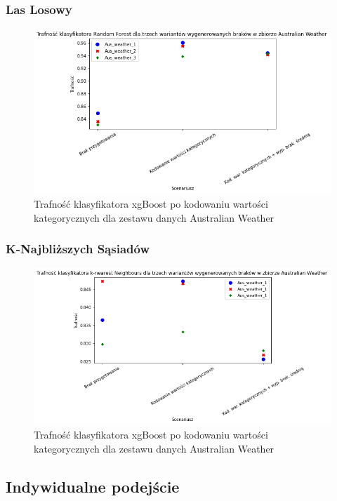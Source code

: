 \documentclass{book}
\begin{document}
\subsubsection{Las Losowy}

\begin{figure}[H]
    \centerline{\includegraphics[scale=0.5]{Aus_Weather_rfc_Kodowanie}}
    \centering
    \caption{Trafność klasyfikatora xgBoost po kodowaniu wartości kategorycznych dla zestawu danych Australian Weather}
    \end{figure}
    
\subsubsection{K-Najbliższych Sąsiadów}
\begin{figure}[H]
    \centerline{\includegraphics[scale=0.5]{Aus_Weather_knn_Kodowanie}}
    \centering
    \caption{Trafność klasyfikatora xgBoost po kodowaniu wartości kategorycznych dla zestawu danych Australian Weather}
    \end{figure}

\subsection{Indywidualne podejście}
\end{document}
